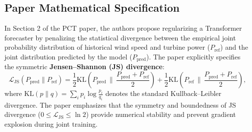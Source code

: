 \documentclass[preprint,3p,times]{elsarticle}
\begin{document}
\subsection{Paper Mathematical Specification}
In Section 2 of the PCT paper, the authors propose regularizing a Transformer forecaster by penalizing the statistical divergence between the empirical joint probability distribution of historical wind speed and turbine power ($P_{\text{ref}}$) and the joint distribution predicted by the model ($P_{\text{pred}}$). The paper explicitly specifies the symmetric \textbf{Jensen--Shannon (JS) divergence}:
\begin{equation}
\mathcal{L}_{\text{JS}}(P_{\text{pred}} \parallel P_{\text{ref}}) = \frac{1}{2} \text{KL}\left(P_{\text{pred}} \,\Big\|\, \frac{P_{\text{pred}} + P_{\text{ref}}}{2}\right) + \frac{1}{2} \text{KL}\left(P_{\text{ref}} \,\Big\|\, \frac{P_{\text{pred}} + P_{\text{ref}}}{2}\right),
\label{eq:js_divergence}
\end{equation}
where $\text{KL}(p \parallel q) = \sum_i p_i \log \frac{p_i}{q_i}$ denotes the standard Kullback--Leibler divergence. The paper emphasizes that the symmetry and boundedness of JS divergence ($0 \le \mathcal{L}_{\text{JS}} \le \ln 2$) provide numerical stability and prevent gradient explosion during joint training.
\end{document}
